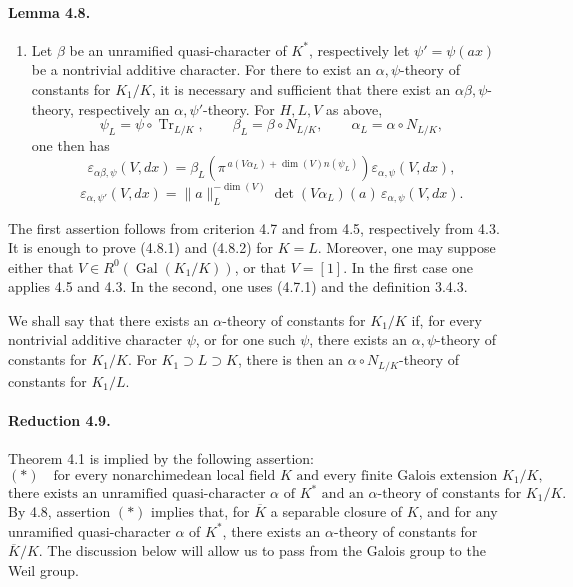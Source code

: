 \documentclass[10pt]{article}
\newcommand{\Gal}{\operatorname{Gal}}
\newcommand{\Tr}{\operatorname{Tr}}
\providecommand{\Gal}{\operatorname{Gal}}
\providecommand{\Gal}{\operatorname{Gal}}
\providecommand{\Tr}{\operatorname{Tr}}
\providecommand{\Gal}{\operatorname{Gal}}
\providecommand{\Tr}{\operatorname{Tr}}
\providecommand{\Gal}{\operatorname{Gal}}
\providecommand{\Tr}{\operatorname{Tr}}
\begin{document}
\paragraph{Lemma 4.8.}
\begin{enumerate}[label=(\roman*)]
\item Let \(\beta\) be an unramified quasi-character of \(K^*\), respectively let \(\psi'=\psi(ax)\) be a nontrivial additive character. For there to exist an \(\alpha,\psi\)-theory of constants for \(K_1/K\), it is necessary and sufficient that there exist an \(\alpha\beta,\psi\)-theory, respectively an \(\alpha,\psi'\)-theory. For \(H,L,V\) as above,
\[
\psi_L=\psi\circ\Tr_{L/K},\qquad
\beta_L=\beta\circ N_{L/K},\qquad
\alpha_L=\alpha\circ N_{L/K},
\]
one then has
\[
\tag{4.8.1}
\varepsilon_{\alpha\beta,\psi}(V,dx)
=
\beta_L\!\left(\pi^{\,a(V\alpha_L)+\dim(V)n(\psi_L)}\right)
\varepsilon_{\alpha,\psi}(V,dx),
\]
\[
\tag{4.8.2}
\varepsilon_{\alpha,\psi'}(V,dx)
=
\|a\|_L^{-\dim(V)}
\det(V\alpha_L)(a)\,
\varepsilon_{\alpha,\psi}(V,dx).
\]
\end{enumerate}
The first assertion follows from criterion 4.7 and from 4.5, respectively from 4.3. It is enough to prove (4.8.1) and (4.8.2) for \(K=L\). Moreover, one may suppose either that \(V\in R^0(\Gal(K_1/K))\), or that \(V=[1]\). In the first case one applies 4.5 and 4.3. In the second, one uses (4.7.1) and the definition 3.4.3.

We shall say that there exists an \(\alpha\)-theory of constants for \(K_1/K\) if, for every nontrivial additive character \(\psi\), or for one such \(\psi\), there exists an \(\alpha,\psi\)-theory of constants for \(K_1/K\). For \(K_1\supset L\supset K\), there is then an \(\alpha\circ N_{L/K}\)-theory of constants for \(K_1/L\).

\paragraph{Reduction 4.9.} Theorem 4.1 is implied by the following assertion:
\[
(*)\quad
\text{for every nonarchimedean local field }K\text{ and every finite Galois extension }K_1/K,
\]
\[
\text{there exists an unramified quasi-character }\alpha\text{ of }K^*
\text{ and an }\alpha\text{-theory of constants for }K_1/K.
\]
By 4.8, assertion \((*)\) implies that, for \(\overline K\) a separable closure of \(K\), and for any unramified quasi-character \(\alpha\) of \(K^*\), there exists an \(\alpha\)-theory of constants for \(\overline K/K\). The discussion below will allow us to pass from the Galois group to the Weil group.
\end{document}

